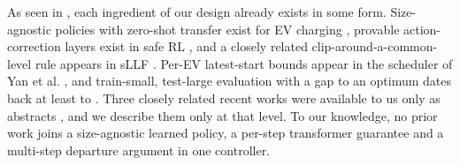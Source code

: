 As seen in , each ingredient of our design already exists in some form.
Size-agnostic policies with zero-shot transfer exist for EV charging \cite{orfanoudakis2026graph,wang2026hetgps}, provable action-correction layers exist in safe RL \cite{tabas2022computationally,wan2025logicinformed}, and a closely related clip-around-a-common-level rule appears in sLLF \cite{chen2022smoothed}.
Per-EV latest-start bounds appear in the scheduler of Yan et al. \cite{yan2026hierarchical}, and train-small, test-large evaluation with a gap to an optimum dates back at least to \cite{sadeghianpourhamami2020definition}.
Three closely related recent works were available to us only as abstracts \cite{orfanoudakis2026can,song2025longterm,eland2026safe}, and we describe them only at that level.
To our knowledge, no prior work joins a size-agnostic learned policy, a per-step transformer guarantee and a multi-step departure argument in one controller.

